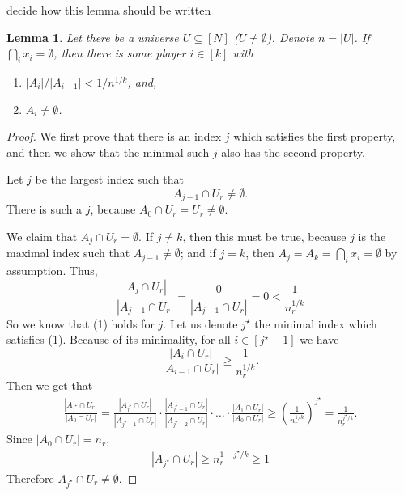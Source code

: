 \documentclass{article}
\newcommand{\TODO}[1]{ {\color{red} #1 }}
\theoremstyle{plain}
\newtheorem{lemma}[theorem]{Lemma}
\begin{document}
\TODO{decide how this lemma should be written}
\begin{lemma}
    Let there be a universe $U \subseteq [N]$ ($U \neq \emptyset$). Denote $n = |U|$. \newline
  If $\bigcap_i x_i = \emptyset$,
  then there is some player $i \in [k]$
  with
  \begin{enumerate}
    \item 
      $|A_{i}| / {|A_{i-1}|} < 1 / n^{1/k}$, and,
    \item $A_i \neq \emptyset$.
  \end{enumerate}
  \label{lemma:narrow}
\end{lemma}
\begin{proof}
  We first prove that there is an index $j$ which satisfies the first property, and then we show
  that the minimal such $j$ also has the second property.

  Let $j$ be the largest index such that 
  \begin{equation*}
    A_{j-1} \cap U_r \neq \emptyset.
  \end{equation*}
  There is such a $j$, because $A_0 \cap U_r = U_r \neq \emptyset$.

  We claim that $A_{j} \cap U_r = \emptyset$.
  If $j \neq k$, then this must be true, because $j$ is the maximal index such that $A_{j-1} \neq \emptyset$;
  and if $j = k$, then $A_j = A_k = \bigcap_i x_i = \emptyset$ by assumption.
  Thus,
  \begin{equation*}
    \frac{|A_j \cap U_r|}{|A_{j-1} \cap U_r|} = \frac{0}{|A_{j-1} \cap U_r|} = 0 < \frac{1}{n_r^{1/k}}
  \end{equation*}
  So we know that (1) holds for $j$.
  Let us denote $j^\star$ the minimal index which satisfies (1).
  Because of its minimality, for all $i \in [j^\star-1]$ we have
  \begin{equation*}
    \frac{|A_i \cap U_r|}{|A_{i-1} \cap U_r|} \geq \frac{1}{n_r^{1/k}}.
  \end{equation*}
  Then we get that
  \begin{align*}
    \frac{|A_{j^\star} \cap U_r|}{|A_0 \cap U_r|} = 
    \frac{|A_{j^\star} \cap U_r|}{|A_{j^\star-1} \cap U_r|} \cdot \frac{|A_{j^\star-1} \cap U_r|}{|A_{j^\star-2} \cap U_r|} \cdot \ldots \cdot \frac{|A_1 \cap U_r|}{|A_0 \cap U_r|}
    \geq
    \left(  \frac{1}{n_r^{1/k}} \right)^{j^\star}
    =
    \frac{1}{n_r^{j^\star/k}}.
  \end{align*}
  Since $|A_0 \cap U_r| = n_r$, 
  \begin{align*}
      |A_{j^\star} \cap U_r| \geq n_r^{1 - j^\star/k} \geq 1
  \end{align*}
    Therefore $A_{j^\star} \cap U_r \neq \emptyset$.
\end{proof}
\end{document}
